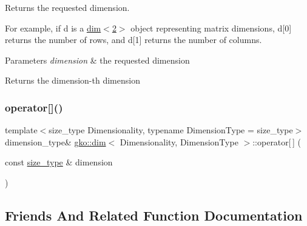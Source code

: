 Returns the requested dimension. 

For example, if {\ttfamily d} is a \hyperlink{structgko_1_1dim}{dim$<$2$>$} object representing matrix dimensions, {\ttfamily d\mbox{[}0\mbox{]}} returns the number of rows, and {\ttfamily d\mbox{[}1\mbox{]}} returns the number of columns.


\begin{DoxyParams}{Parameters}
{\em dimension} & the requested dimension\\
\hline
\end{DoxyParams}
\begin{DoxyReturn}{Returns}
the {\ttfamily dimension}-\/th dimension 
\end{DoxyReturn}
\mbox{\label{structgko_1_1dim_a02bf1bbda6859052e8b881dfd43b64a9}} 
\subsubsection{\texorpdfstring{operator[]()}{operator[]()}\hspace{0.1cm}{\footnotesize\ttfamily [2/2]}}
{\footnotesize\ttfamily template$<$size\+\_\+type Dimensionality, typename Dimension\+Type = size\+\_\+type$>$ \\
dimension\+\_\+type\& \hyperlink{structgko_1_1dim}{gko\+::dim}$<$ Dimensionality, Dimension\+Type $>$\+::operator\mbox{[}$\,$\mbox{]} (\begin{DoxyParamCaption}\item[{const \hyperlink{namespacegko_a6e5c95df0ae4e47aab2f604a22d98ee7}{size\+\_\+type} \&}]{dimension }\end{DoxyParamCaption})\hspace{0.3cm}{\ttfamily [noexcept]}}







\subsection{Friends And Related Function Documentation}
\mbox{\label{structgko_1_1dim_a27d25e410396817b4ceafbae3d5df5c8}} 

